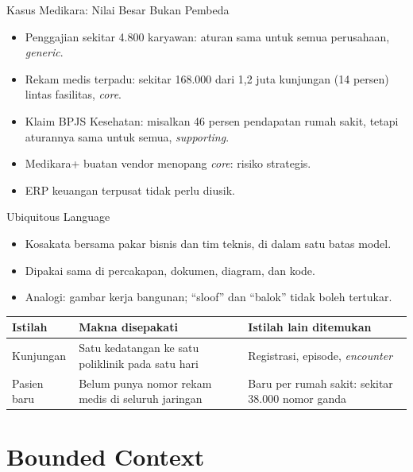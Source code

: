 \documentclass[aspectratio=169, table, 12pt]{beamer}
\begin{document}
\begin{frame}{{\Large Kasus Medikara: Nilai Besar Bukan Pembeda}}
  \vspace{10pt}
  \begin{itemize}
    \item Penggajian sekitar 4.800 karyawan: aturan sama untuk semua perusahaan,
          \textit{generic}.
    \item Rekam medis terpadu: sekitar 168.000 dari 1,2 juta kunjungan (14 persen)
          lintas fasilitas, \textit{core}.
    \item Klaim BPJS Kesehatan: misalkan 46 persen pendapatan rumah sakit, tetapi
          aturannya sama untuk semua, \textit{supporting}.
    \item Medikara+ buatan vendor menopang \textit{core}: risiko strategis.
    \item ERP keuangan terpusat tidak perlu diusik.
  \end{itemize}
\end{frame}

\begin{frame}{{\Large Ubiquitous Language}}
  \small
  \begin{itemize}
    \item Kosakata bersama pakar bisnis dan tim teknis, di dalam satu batas model.
    \item Dipakai sama di percakapan, dokumen, diagram, dan kode.
    \item Analogi: gambar kerja bangunan; ``sloof'' dan ``balok'' tidak boleh
          tertukar.
  \end{itemize}
  \footnotesize
  \begin{tabularx}{\textwidth}{>{\raggedright\arraybackslash}p{2.4cm}
      >{\raggedright\arraybackslash}X >{\raggedright\arraybackslash}p{4.6cm}}
    \hline
    \textbf{Istilah} & \textbf{Makna disepakati} & \textbf{Istilah lain ditemukan} \\
    \hline
    Kunjungan & Satu kedatangan ke satu poliklinik pada satu hari & Registrasi,
      episode, \textit{encounter} \\
    \hline
    Pasien baru & Belum punya nomor rekam medis di seluruh jaringan & Baru per
      rumah sakit: sekitar 38.000 nomor ganda \\
    \hline
  \end{tabularx}
\end{frame}

\section{Bounded Context}
\end{document}
